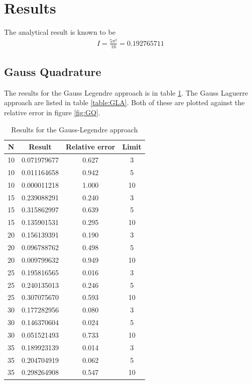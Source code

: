 \documentclass[11pt,a4paper,english,final]{article}
\numberwithin{equation}{section}
\begin{document}
\section{Results}

The analytical result is known to be
\begin{gather}
I = \frac{5\pi^2}{16} = 0.192765711
\end{gather}


\subsection{Gauss Quadrature}


The results for the Gauss Legendre approach is in table \ref{table:GLE}.
The Gauss Laguerre approach are listed in table \ref{table:GLA}. Both of 
these are plotted against the relative error in figure \ref{fig:GQ}.


\begin{table}
\centering
\caption{Results for the Gauss-Legendre approach} \vspace{2mm}
\begin{tabular}{|c|c|c|c|} \hline
N & Result & Relative error & Limit \\ \hline
10 & 0.071979677 & 0.627 & 3\\
10 & 0.011164658 & 0.942 & 5\\
10 & 0.000011218 & 1.000 & 10\\ \hline
15 & 0.239088291 & 0.240 & 3\\
15 & 0.315862997 & 0.639 & 5\\
15 & 0.135901531 & 0.295 & 10\\ \hline
20 & 0.156139391 & 0.190 & 3\\
20 & 0.096788762 & 0.498 & 5\\
20 & 0.009799632 & 0.949 & 10\\ \hline
25 & 0.195816565 & 0.016 & 3\\
25 & 0.240135013 & 0.246 & 5\\
25 & 0.307075670 & 0.593 & 10\\ \hline
30 & 0.177282956 & 0.080 & 3\\
30 & 0.146370604 & 0.024 & 5\\
30 & 0.051521493 & 0.733 & 10\\ \hline
35 & 0.189923139 & 0.014 & 3\\
35 & 0.204704919 & 0.062 & 5\\
35 & 0.298264908 & 0.547 & 10
\\ \hline
\end{tabular}
\label{table:GLE}
\end{table}
\end{document}
